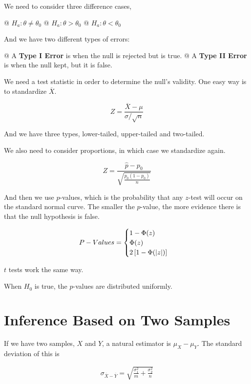 We need to consider three difference cases,

\NewList
\begin{easylist}
    @ $H_a : \theta \neq \theta_0$
    @ $H_a : \theta > \theta_0$
    @ $H_a : \theta < \theta_0$
\end{easylist}

And we have two different types of errors:

\NewList
\begin{easylist}
    @ A \textbf{Type I Error} is when the null is rejected but is true.
    @ A \textbf{Type II Error} is when the null kept, but it is false.
\end{easylist}

We need a test statistic in order to determine the null's validity. One easy way is to standardize $\overline{X}$.

\[
    Z = \frac{\overline{X} - \mu}{\sigma / \sqrt{n}}
\]

And we have three types, lower-tailed, upper-tailed and two-tailed.

We also need to consider proportions, in which case we standardize again.

\[
    Z = \frac{\hat{p} - p_0}{\sqrt{\frac{p_0 (1 - p_0)}{n}}}
\]

And then we use $p$-values, which is the probability that any $z$-test will occur on the standard normal curve. The
smaller the $p$-value, the more evidence there is that the null hypothesis is false.

\[
    P-Values =
    \begin{cases}
        1 - \Phi(z)\\
        \Phi(z)\\
        2 \left[ 1 - \Phi(\left\lvert z \right\rvert) \right]
    \end{cases}
\]

$t$ tests work the same way.

When $H_0$ is true, the $p$-values are distributed uniformly.

\section{Inference Based on Two Samples}
If we have two samples, $X$ and $Y$, a natural estimator is $\mu_X - \mu_Y$. The standard deviation of this is

\begin{equation*}
    \begin{aligned}
        \sigma_{\overline{X} - \overline{Y}} = \sqrt{\frac{\sigma_1^2}{m} + \frac{\sigma_2^2}{n}}
    \end{aligned}
\end{equation*}

